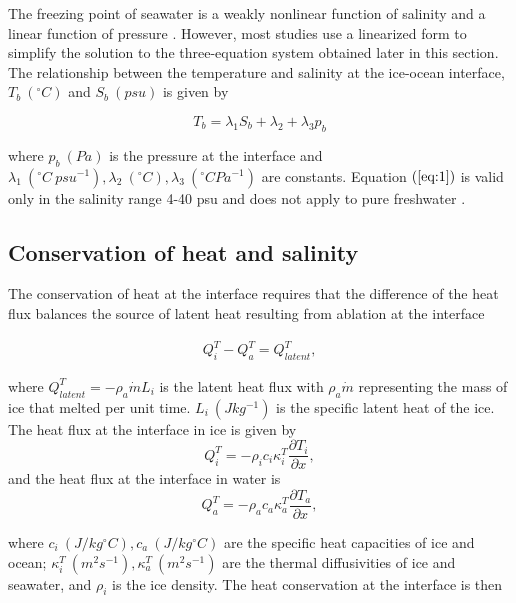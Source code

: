 \documentclass[11pt,a4paper]{article}
\begin{document}
    	The freezing point of seawater is a weakly nonlinear function of salinity and a linear function of pressure \citep{millero1978freezing}. %
    	However, most studies use a linearized form to simplify the solution to the three-equation system obtained later in this section. The relationship between the temperature and salinity at the ice-ocean interface, $T_b\ (^{\circ}C)$ and $S_b\ (psu)$ is given by
		
		\begin{equation}
			\label{eq:1}
			T_b = \lambda_1 S_b+\lambda_2+\lambda_3p_b
		\end{equation}
		
		\noindent where $p_b\ (Pa)$ is the pressure at the interface and $\lambda_1\ (^{\circ}C\ psu^{-1}),\lambda_2\ (^{\circ}C),\lambda_3\ (^{\circ}C Pa^{-1})$ are constants. Equation $(\ref{eq:1})$ is valid only in the salinity range 4-40 psu and does not apply to pure freshwater \citep{holland1999modeling}.
		
		
		\subsection{Conservation of heat and salinity}
		
		The conservation of heat at the interface requires that the difference of the heat flux balances the source of latent heat resulting from ablation at the interface
		
		\begin{eqnarray}
			\label{eq:2}
			Q_i^T - Q_a^T = Q_{latent}^T,
		\end{eqnarray}
		
		\noindent where $Q_{latent}^T = -\rho_a\dot{m}L_i$ is the latent heat flux with $\rho_a\dot{m}$ representing the mass of ice that melted per unit time. $L_i\ (Jkg^{-1})$ is the specific latent heat of the ice. The heat flux at the interface in ice is given by $$Q_i^T = -\rho_i c_i\kappa_i^T\dfrac{\partial T_i}{\partial x},$$ and the heat flux at the interface in water is $$ Q_a^T = -\rho_a c_a\kappa_a^T\dfrac{\partial T_a}{\partial x},$$ 
		
		\noindent where $c_i\ (J /kg ^{\circ}C), c_a\ (J /kg ^{\circ} C)$ are the specific heat capacities of ice and ocean; $\kappa_i^T\ (m^2s^{-1}), \kappa_a^T\ (m^2s^{-1})$ are the thermal diffusivities of ice and seawater, and $\rho_i$ is the ice density. The heat conservation at the interface is then
		
\end{document}
